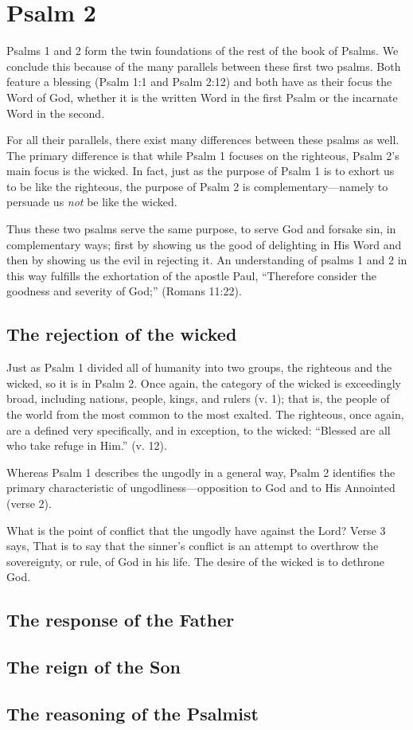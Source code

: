 \chapter{Psalm 2}
Psalms 1 and 2 form the twin foundations of the rest of the book of Psalms.
We conclude this because of the many parallels between these first two psalms.
Both feature a blessing (Psalm 1:1 and Psalm 2:12) and 
    both have as their focus the Word of God,
    whether it is the written Word in the first Psalm
    or the incarnate Word in the second.

For all their parallels, there exist many differences between these psalms as well.
The primary difference is that while Psalm 1 focuses on the righteous,
    Psalm 2's main focus is the wicked.
In fact, just as the purpose of Psalm 1 is to exhort us to be like the righteous,
    the purpose of Psalm 2 is complementary---namely
    to persuade us \emph{not} be like the wicked.

Thus these two psalms serve the same purpose, 
    to serve God and forsake sin,
    in complementary ways;
    first by showing us the good of delighting in His Word
    and then by showing us the evil in rejecting it.
An understanding of psalms 1 and 2 in this way fulfills
    the exhortation of the apostle Paul,
    ``Therefore consider the goodness and severity of God;''
    (Romans 11:22).

\section{The rejection of the wicked}
Just as Psalm 1 divided all of humanity into two groups,
    the righteous and the wicked, so it is in Psalm 2.
Once again, the category of the wicked is exceedingly broad,
    including nations, people, kings, and rulers (v. 1);
    that is, the people of the world from the most common to the most exalted.
The righteous, once again, are a defined very specifically, and in exception,
    to the wicked: ``Blessed are all who take refuge in Him.'' (v. 12).
    
Whereas Psalm 1 describes the ungodly in a general way,
    Psalm 2 identifies the primary characteristic of ungodliness---opposition
    to God and to His Annointed (verse 2).

What is the point of conflict that the ungodly have against the Lord?
Verse 3 says,
That is to say that the sinner's conflict is an attempt to
    overthrow the sovereignty, or rule, of God in his life.
The desire of the wicked is to dethrone God.


\section{The response of the Father}
\section{The reign of the Son}
\section{The reasoning of the Psalmist}
